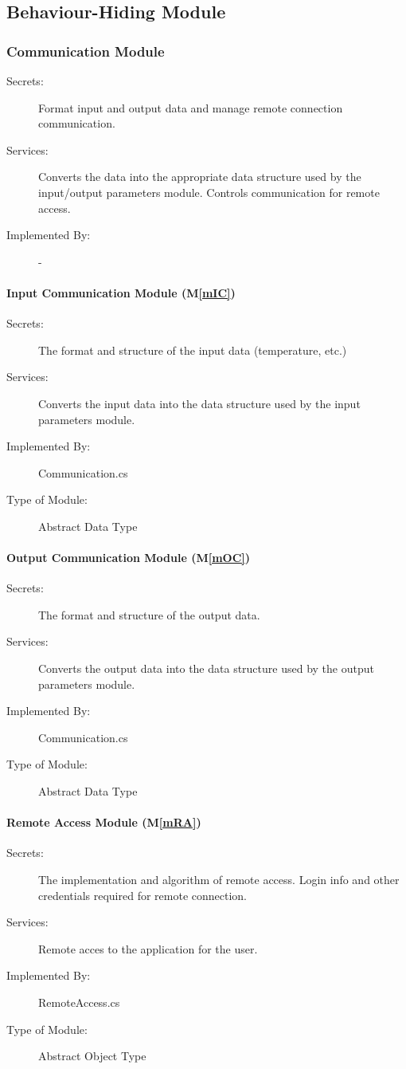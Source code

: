 \documentclass[12pt, titlepage]{article}
\newcommand{\mref}[1]{M\ref{#1}}
\begin{document}
\subsection{Behaviour-Hiding Module}

\subsubsection{Communication Module}
\begin{description}
  \item[Secrets:] Format input and output data and manage remote connection communication.
  \item[Services:]Converts the data into the appropriate data structure used by the
    input/output parameters module. Controls communication for remote access. 
  \item[Implemented By:] -
  \end{description}

\paragraph{Input Communication Module (\mref{mIC})}
\begin{description}
\item[Secrets:]The format and structure of the input data (temperature, etc.)
\item[Services:]Converts the input data into the data structure used by the
  input parameters module.
\item[Implemented By:] Communication.cs
\item[Type of Module:] Abstract Data Type
\end{description}

\paragraph{Output Communication Module (\mref{mOC})}
\begin{description}
\item[Secrets:]The format and structure of the output data.
\item[Services:]Converts the output data into the data structure used by the output parameters module. 
\item[Implemented By:] Communication.cs
\item[Type of Module:] Abstract Data Type
\end{description}

\paragraph{Remote Access Module (\mref{mRA})}
\begin{description}
\item[Secrets:]The implementation and algorithm of remote access. Login info and other credentials required for remote connection.
\item[Services:]Remote acces to the application for the user.
\item[Implemented By:] RemoteAccess.cs
\item[Type of Module:] Abstract Object Type
\end{description}
\end{document}
